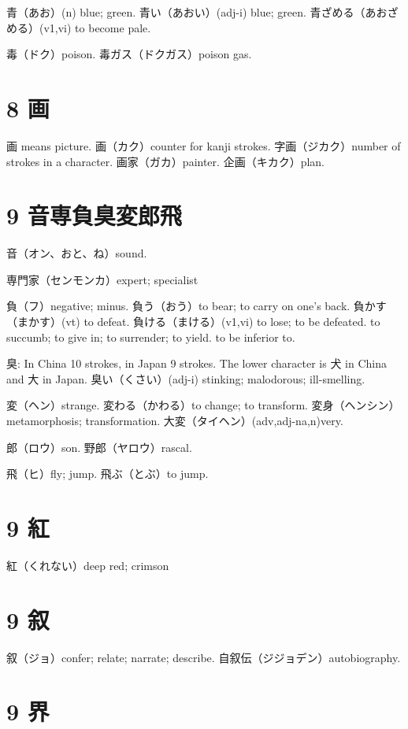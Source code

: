 青（あお）(n) blue; green.
青い（あおい）(adj-i) blue; green.
青ざめる（あおざめる）(v1,vi) to become pale.

毒（ドク）poison.
毒ガス（ドクガス）poison gas.

\section{8 画}

画 means picture.
画（カク）counter for kanji strokes.
字画（ジカク）number of strokes in a character.
画家（ガカ）painter.
企画（キカク）plan.

\section{9 音専負臭変郎飛}

音（オン、おと、ね）sound.

専門家（センモンカ）expert; specialist

負（フ）negative; minus.
負う（おう）to bear; to carry on one's back.
負かす（まかす）(vt) to defeat.
負ける（まける）(v1,vi)
to lose; to be defeated.
to succumb; to give in; to surrender; to yield.
to be inferior to.

臭: In China 10 strokes, in Japan 9 strokes.
The lower character is 犬 in China and 大 in Japan.
臭い（くさい）(adj-i) stinking; malodorous; ill-smelling.

変（ヘン）strange.
変わる（かわる）to change; to transform.
変身（ヘンシン）metamorphosis; transformation.
大変（タイヘン）(adv,adj-na,n)very.

郎（ロウ）son.
野郎（ヤロウ）rascal.

飛（ヒ）fly; jump.
飛ぶ（とぶ）to jump.

\section{9 紅}

紅（くれない）deep red; crimson

\section{9 叙}

叙（ジョ）confer; relate; narrate; describe.
自叙伝（ジジョデン）autobiography.

\section{9 界}

